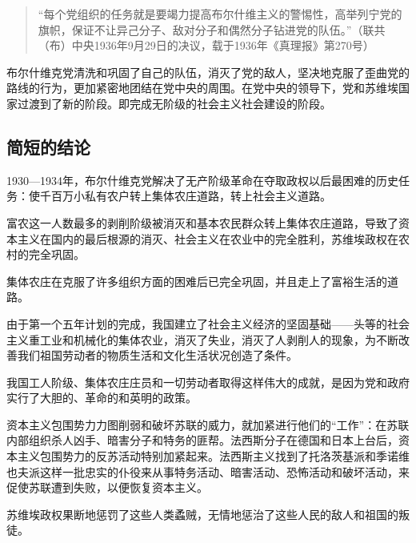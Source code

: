 \begin{quotation}
“每个党组织的任务就是要竭力提高布尔什维主义的警惕性，高举列宁党的旗帜，保证不让异己分子、敌对分子和偶然分子钻进党的队伍。”（联共（布）中央1936年9月29日的决议，载于1936年《真理报》第270号）
\end{quotation}

布尔什维克党清洗和巩固了自己的队伍，消灭了党的敌人，坚决地克服了歪曲党的路线的行为，更加紧密地团结在党中央的周围。在党中央的领导下，党和苏维埃国家过渡到了新的阶段。即完成无阶级的社会主义社会建设的阶段。


\subsection{简短的结论}

1930—1934年，布尔什维克党解决了无产阶级革命在夺取政权以后最困难的历史任务：使千百万小私有农户转上集体农庄道路，转上社会主义道路。

富农这一人数最多的剥削阶级被消灭和基本农民群众转上集体农庄道路，导致了资本主义在国内的最后根源的消灭、社会主义在农业中的完全胜利，苏维埃政权在农村的完全巩固。

集体农庄在克服了许多组织方面的困难后已完全巩固，并且走上了富裕生活的道路。

由于第一个五年计划的完成，我国建立了社会主义经济的坚固基础——头等的社会主义重工业和机械化的集体农业，消灭了失业，消灭了人剥削人的现象，为不断改善我们祖国劳动者的物质生活和文化生活状况创造了条件。

我国工人阶级、集体农庄庄员和一切劳动者取得这样伟大的成就，是因为党和政府实行了大胆的、革命的和英明的政策。

资本主义包围势力力图削弱和破坏苏联的威力，就加紧进行他们的“工作”：在苏联内部组织杀人凶手、暗害分子和特务的匪帮。法西斯分子在德国和日本上台后，资本主义包围势力的反苏活动特别加紧起来。法西斯主义找到了托洛茨基派和季诺维也夫派这样一批忠实的仆役来从事特务活动、暗害活动、恐怖活动和破坏活动，来促使苏联遭到失败，以便恢复资本主义。

苏维埃政权果断地惩罚了这些人类蟊贼，无情地惩治了这些人民的敌人和祖国的叛徒。

